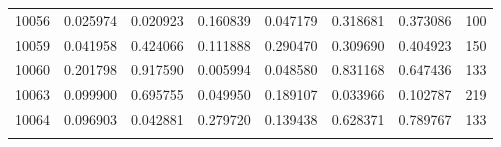 \begin{table}[H]
{\begin{tabular}{cccccccc}
10056 & {\color{red}0.025974} & {\color{red}0.020923} & 0.160839 & {\color{red}0.047179} & 0.318681 & 0.373086 & 100 \\ 
10059 & {\color{red}0.041958} & 0.424066 & 0.111888 & 0.290470 & 0.309690 & 0.404923 & 150 \\ 
10060 & 0.201798 & 0.917590 & {\color{red}0.005994} & {\color{red}0.048580} & 0.831168 & 0.647436 & 133 \\ 
10063 & 0.099900 & 0.695755 & {\color{red}0.049950} & 0.189107 & {\color{red}0.033966} & 0.102787 & 219 \\ 
10064 & 0.096903 & {\color{red}0.042881} & 0.279720 & 0.139438 & 0.628371 & 0.789767 & 133 \\ \hline
\label{tab:nosocsI}
\end{tabular}
}
\end{table}


